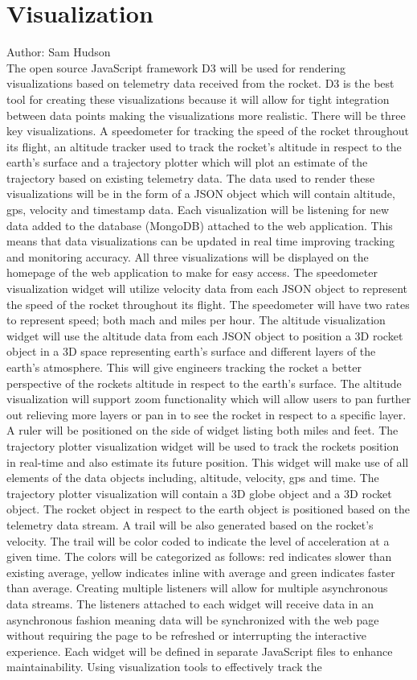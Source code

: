 \documentclass[onecolumn, draftclsnofoot,10pt, compsoc]{IEEEtran}
\begin{document}
\section {Visualization}
Author: Sam Hudson\\
The open source JavaScript framework D3 will be used for rendering visualizations based on telemetry data received from the rocket. D3 is the best tool for creating these visualizations because it will allow for tight integration between data points making the visualizations more realistic. There will be three key visualizations. A speedometer for tracking the speed of the rocket throughout its flight, an altitude tracker used to track the rocket’s altitude in respect to the earth’s surface and a trajectory plotter which will plot an estimate of the trajectory based on existing telemetry data. The data used to render these visualizations will be in the form of a JSON object which will contain altitude, gps, velocity and timestamp data. Each visualization will be listening for new data added to the database (MongoDB) attached to the web application. This means that data visualizations can be updated in real time improving tracking and monitoring accuracy. All three visualizations will be displayed on the homepage of the web application to make for easy access. The speedometer visualization widget will utilize velocity data from each JSON object to represent the speed of the rocket throughout its flight. The speedometer will have two rates to represent speed; both mach and miles per hour. The altitude visualization widget will use the altitude data from each JSON object to position a 3D rocket object in a 3D space representing earth's surface and different layers of the earth’s atmosphere. This will give engineers tracking the rocket a better perspective of the rockets altitude in respect to the earth's surface. The altitude visualization will support zoom functionality which will allow users to pan further out relieving more layers or pan in to see the rocket in respect to a specific layer. A ruler will be positioned on the side of widget listing both miles and feet. The trajectory plotter visualization widget will be used to track the rockets position in real-time and also estimate its future position. This widget will make use of all elements of the data objects including, altitude, velocity, gps and time. The trajectory plotter visualization will contain a 3D globe object and a 3D rocket object. The rocket object in respect to the earth object is positioned based on the telemetry data stream. A trail will be also generated based on the rocket’s velocity. The trail will be color coded to indicate the level of acceleration at a given time. The colors will be categorized as follows: red indicates slower than existing average, yellow indicates inline with average and green indicates faster than average. Creating multiple listeners will allow for multiple asynchronous data streams. The listeners attached to each widget will receive data in an asynchronous fashion meaning data will be synchronized with the web page without requiring the page to be refreshed or interrupting the interactive experience. Each widget will be defined in separate JavaScript files to enhance maintainability. Using visualization tools to effectively track the 
\end{document}
